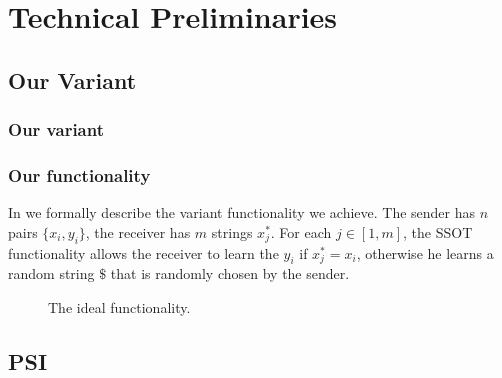 \section{Technical Preliminaries}
\label{sect:prelims}

\subsection{Our \SSOT Variant}
\subsubsection{Our \SSOT variant}
\label{sec:ssotvar}
\subsubsection{Our \SSOT functionality}
\label{sec:ssotfunc}

In  we formally describe the variant \SSOT functionality we achieve. The sender has $n$ pairs $\{x_i, y_i\}$, the receiver has $m$ strings $x^*_j$. For each $j \in [1,m]$, the SSOT functionality allows the receiver to learn the $y_i$ if $x^*_j=x_i$, otherwise he learns a random string $\$$ that is randomly chosen by the sender.

\begin{figure}[htb]\centering
{}
\caption{The \SSOT ideal functionality.}
\label{fig:ssotfunc}
\end{figure} 


\subsection{PSI }
